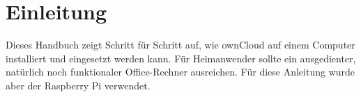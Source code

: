 \section{Einleitung}
Dieses Handbuch zeigt Schritt für Schritt auf, wie ownCloud auf einem Computer installiert und eingesetzt werden kann.
Für Heimanwender sollte ein ausgedienter, natürlich noch funktionaler Office-Rechner ausreichen. Für diese Anleitung wurde aber der Raspberry Pi verwendet.


